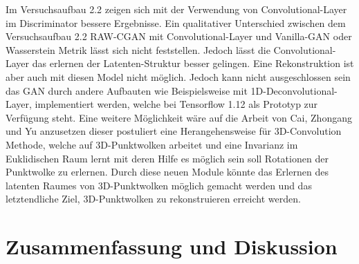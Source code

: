 \documentclass{llncs}
\begin{document}
Im Versuchsaufbau 2.2 zeigen sich mit der Verwendung von Convolutional-Layer im Discriminator bessere Ergebnisse. Ein qualitativer Unterschied zwischen dem Versuchsaufbau 2.2 RAW-CGAN mit Convolutional-Layer und Vanilla-GAN oder Wasserstein Metrik lässt sich nicht feststellen. Jedoch lässt die Convolutional-Layer das erlernen der Latenten-Struktur besser gelingen. Eine Rekonstruktion ist aber auch mit diesen Model nicht möglich. Jedoch kann nicht ausgeschlossen sein das GAN durch andere Aufbauten wie Beispielsweise mit 1D-Deconvolutional-Layer, implementiert werden, welche bei Tensorflow 1.12 als Prototyp zur Verfügung steht. Eine weitere Möglichkeit wäre auf die Arbeit von Cai, Zhongang  und Yu \cite{3d-conv} anzusetzen dieser postuliert eine Herangehensweise für 3D-Convolution Methode, welche auf 3D-Punktwolken arbeitet und eine Invarianz im Euklidischen Raum lernt mit deren Hilfe es möglich sein soll Rotationen der Punktwolke zu erlernen. Durch diese neuen Module könnte das Erlernen des latenten Raumes von 3D-Punktwolken möglich gemacht werden und das letztendliche Ziel, 3D-Punktwolken zu rekonstruieren erreicht werden. 
\newpage
\section{Zusammenfassung und Diskussion }
\end{document}
